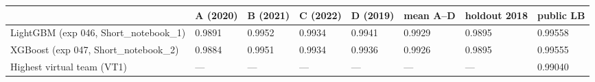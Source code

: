 \begin{tabular}{llllllll}
\toprule
\textbf{} & \textbf{A (2020)} & \textbf{B (2021)} & \textbf{C (2022)} & \textbf{D (2019)} & \textbf{mean A–D} & \textbf{holdout 2018} & \textbf{public LB} \\
\midrule
LightGBM (exp 046, Short\_\allowbreak{}notebook\_\allowbreak{}1) & 0.9891 & 0.9952 & 0.9934 & 0.9941 & 0.9929 & 0.9895 & 0.99558 \\
XGBoost (exp 047, Short\_\allowbreak{}notebook\_\allowbreak{}2) & 0.9884 & 0.9951 & 0.9934 & 0.9936 & 0.9926 & 0.9895 & 0.99555 \\
Highest virtual team (VT1) & — & — & — & — & — & — & 0.99040 \\
\bottomrule
\end{tabular}
